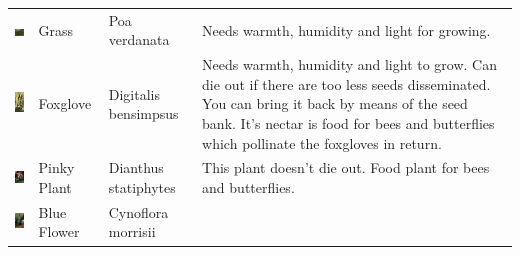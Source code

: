 \documentclass[11pt,twoside,a4paper]{article}
\begin{document}
\begin{longtable}{ p{1.60cm} p{1.95cm} p{2.55cm} p{11.00cm} }
	\begin{minipage}[ht]{1.55cm} \includegraphics[width=1.50cm]{img/grass.jpg} \end{minipage}		
																&	Grass 			&	Poa verdanata		
																&	Needs warmth, humidity and light for growing. 	\\
	\begin{minipage}[ht]{1.55cm} \includegraphics[width=1.50cm]{img/fox.jpg} \end{minipage}		
																&	Foxglove		&	Digitalis \newline bensimpsus		
																&	Needs warmth, humidity and light to grow. Can die out if there are too less seeds disseminated. You can bring it back by means of the seed bank. It's nectar is food for bees and butterflies which pollinate the foxgloves in return.	\\
	\begin{minipage}[ht]{1.55cm} \includegraphics[width=1.50cm]{img/pinkplant.jpg} \end{minipage}		
																&	Pinky Plant		&	Dianthus \newline statiphytes		
																&	This plant doesn't die out. Food plant for bees and butterflies.	\\
	\begin{minipage}[ht]{1.55cm} \includegraphics[width=1.50cm]{img/blaupfl.jpg} \end{minipage}		
																&	Blue Flower		&	Cynoflora \newline morrisii		

\end{longtable}
\end{document}
